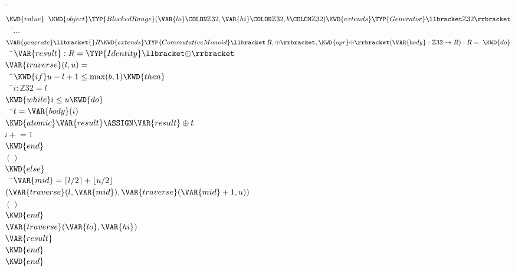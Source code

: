\begin{Fortress}
{\tt~}\pushtabs\=\+\( \KWD{value}\;\;\KWD{object} \TYP{BlockedRange}(\VAR{lo}\COLON \mathbb{Z}32, \VAR{hi}\COLON \mathbb{Z}32, b\COLON \mathbb{Z}32) \KWD{extends} \TYP{Generator}\llbracket\mathbb{Z}32\rrbracket\)\\
{\tt~~}\pushtabs\=\+\(   \ldots\)\\
\(   \VAR{generate}\llbracket{}R \KWD{extends} \TYP{CommutativeMonoid}\llbracket\,R, \oplus\rrbracket, \KWD{opr} \mathord{\oplus}\rrbracket(\VAR{body} \mathrel{\mathtt{:}} \mathbb{Z}32 \rightarrow R) \mathrel{\mathtt{:}} R = \;\KWD{do}\)\\
{\tt~~}\pushtabs\=\+\(     \VAR{result} \mathrel{\mathtt{:}} R = \TYP{Identity}\llbracket\mathord{\oplus}\rrbracket\)\\
\(     \VAR{traverse}(l,u) =\)\\
{\tt~~}\pushtabs\=\+\(       \KWD{if} u-l+1 \leq \max(b,1) \KWD{then}\)\\
{\tt~~}\pushtabs\=\+\(         i \mathrel{\mathtt{:}} \mathbb{Z}32 = l\)\\
\(         \KWD{while} i \leq u \KWD{do}\)\\
{\tt~~}\pushtabs\=\+\(           t = \VAR{body}(i)\)\\
\(           \KWD{atomic} \VAR{result} \ASSIGN \VAR{result} \oplus t\)\\
\(           i \mathrel{+}= 1\)\-\\\poptabs
\(         \KWD{end}\)\\
\(         ()\)\-\\\poptabs
\(       \KWD{else}\)\\
{\tt~~}\pushtabs\=\+\(         \VAR{mid} = \lceil l/2 \rceil + \lfloor u/2 \rfloor\)\\
\(         (\VAR{traverse}(l,\VAR{mid}), \VAR{traverse}(\VAR{mid}+1,u))\)\\
\(         ()\)\-\\\poptabs
\(       \KWD{end}\)\-\\\poptabs
\(     \VAR{traverse}(\VAR{lo}, \VAR{hi})\)\\
\(     \VAR{result}\)\-\\\poptabs
\(   \KWD{end}\)\-\\\poptabs
\( \KWD{end}\)\-\\\poptabs
\end{Fortress}

